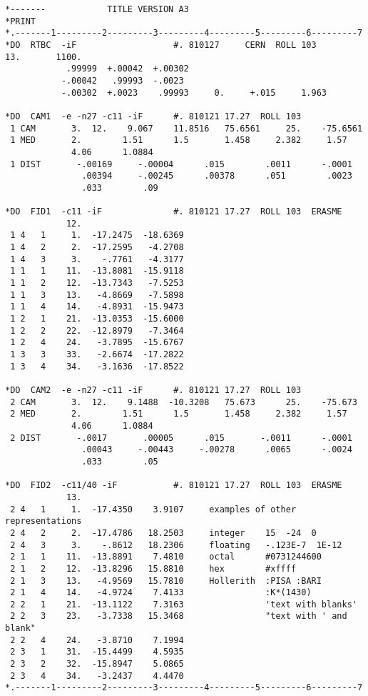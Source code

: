 \begin{verbatim}
*-------            TITLE VERSION A3
*PRINT
*.-------1---------2---------3---------4---------5---------6---------7
*DO  RTBC  -iF                   #. 810127     CERN  ROLL 103
13.       1100.
            .99999  +.00042  +.00302
           -.00042   .99993  -.0023
           -.00302  +.0023    .99993     0.     +.015     1.963

*DO  CAM1  -e -n27 -c11 -iF      #. 810121 17.27  ROLL 103
 1 CAM       3.  12.    9.067    11.8516   75.6561     25.    -75.6561
 1 MED       2.        1.51      1.5       1.458     2.382     1.57
             4.06      1.0884
 1 DIST       -.00169     -.00004      .015        .0011      -.0001
               .00394     -.00245      .00378      .051        .0023
               .033        .09

*DO  FID1  -c11 -iF              #. 810121 17.27  ROLL 103  ERASME
            12.
 1 4   1     1.  -17.2475  -18.6369
 1 4   2     2.  -17.2595   -4.2708
 1 4   3     3.    -.7761   -4.3177
 1 1   1    11.  -13.8081  -15.9118
 1 1   2    12.  -13.7343   -7.5253
 1 1   3    13.   -4.8669   -7.5898
 1 1   4    14.   -4.8931  -15.9473
 1 2   1    21.  -13.0353  -15.6000
 1 2   2    22.  -12.8979   -7.3464
 1 2   4    24.   -3.7895  -15.6767
 1 3   3    33.   -2.6674  -17.2822
 1 3   4    34.   -3.1636  -17.8522

*DO  CAM2  -e -n27 -c11 -iF      #. 810121 17.27  ROLL 103
 2 CAM       3.  12.    9.1488  -10.3208   75.673      25.    -75.673
 2 MED       2.        1.51      1.5       1.458     2.382     1.57
             4.06      1.0884
 2 DIST       -.0017       .00005      .015       -.0011      -.0001
               .00043     -.00443     -.00278      .0065      -.0024
               .033        .05

*DO  FID2  -c11/40 -iF           #. 810121 17.27  ROLL 103  ERASME
            13.
 2 4   1     1.  -17.4350    3.9107     examples of other representations
 2 4   2     2.  -17.4786   18.2503     integer    15  -24  0
 2 4   3     3.    -.8612   18.2306     floating   -.123E-7  1E-12
 2 1   1    11.  -13.8891    7.4810     octal      #0731244600
 2 1   2    12.  -13.8296   15.8810     hex        #xffff
 2 1   3    13.   -4.9569   15.7810     Hollerith  :PISA :BARI
 2 1   4    14.   -4.9724    7.4133                :K*(1430)
 2 2   1    21.  -13.1122    7.3163                'text with blanks'
 2 2   3    23.   -3.7338   15.3468                "text with ' and blank"
 2 2   4    24.   -3.8710    7.1994
 2 3   1    31.  -15.4499    4.5935
 2 3   2    32.  -15.8947    5.0865
 2 3   4    34.   -3.2437    4.4470
*.-------1---------2---------3---------4---------5---------6---------7
\end{verbatim} 

